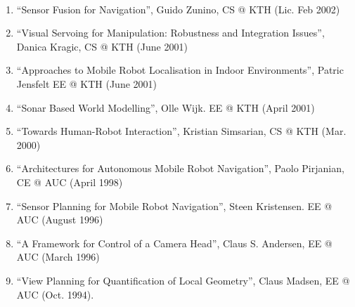 \documentclass{article}
\begin{document}
\begin{cv}
\begin{cvlist}{~}
\begin{enumerate}
			      (Mar 2002)
			\item ``Sensor Fusion for Navigation'', Guido Zunino, CS @ KTH (Lic. Feb
			      2002)
			\item ``Visual Servoing for Manipulation: Robustness and Integration
			      Issues'', Danica Kragic, CS @ KTH (June 2001)
			\item ``Approaches to Mobile Robot Localisation in Indoor Environments'',
			      Patric Jensfelt EE @ KTH (June 2001)
			\item ``Sonar Based World Modelling'', Olle Wijk. EE @ KTH (April 2001)
			\item ``Towards Human-Robot Interaction'', Kristian Simsarian, CS @ KTH
			      (Mar. 2000)
			\item ``Architectures for Autonomous Mobile Robot Navigation'', Paolo
			      Pirjanian, CE @ AUC (April 1998)
			\item ``Sensor Planning for Mobile Robot Navigation'', Steen Kristensen. EE
			      @ AUC (August 1996)
			\item ``A Framework for Control of a Camera Head'', Claus S. Andersen, EE @
			      AUC (March 1996)
			\item ``View Planning for Quantification of Local Geometry'', Claus Madsen,
			      EE @ AUC (Oct. 1994).
		\end{enumerate}


\end{cvlist}
\end{cv}
\end{document}
